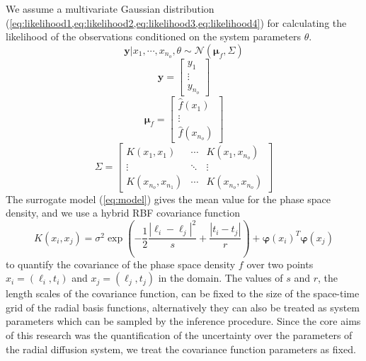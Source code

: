 We assume a multivariate Gaussian distribution 
(\cref{eq:likelihood1,eq:likelihood2,eq:likelihood3,eq:likelihood4}) for calculating the 
likelihood of the observations conditioned on the system parameters $\theta$.  
%
\begin{equation}\label{eq:likelihood1}
\mathbf{y} | x_1, \cdots, x_{n_o}, \theta \sim \mathcal{N} \left(\mathbf{\mu}_f, \Sigma \right )
\end{equation}
%
\begin{equation}\label{eq:likelihood2}
\mathbf{y} = \begin{bmatrix}
y_1\\ 
\vdots\\ 
y_{n_o}
\end{bmatrix}
\end{equation}
%
\begin{equation}\label{eq:likelihood3}
  \mathbf{\mu}_f = \begin{bmatrix}
\hat{f}(x_1)\\ 
\vdots\\ 
\hat{f}(x_{n_o})
\end{bmatrix}
\end{equation}
%
\begin{equation}\label{eq:likelihood4}
    \Sigma = \begin{bmatrix}
K(x_1, x_1) & \cdots  & K(x_1, x_{n_o})\\ 
\vdots & \ddots & \vdots\\ 
K(x_{n_o}, x_{n_{1}}) & \cdots  & K(x_{n_o}, x_{n_{o}})
\end{bmatrix}
\end{equation}
%
The surrogate model (\cref{eq:model}) gives the mean value for the phase space density, and we use 
a hybrid RBF covariance function 
\[
  K(x_{i}, x_{j}) = \sigma^2 \exp \left(
    -\frac{1}{2} \frac{|\ell_i - \ell_j|^2}{s} + \frac{|t_i - t_j|}{r}
  \right)  + \mathbf{\varphi}(x_i)^{T}\mathbf{\varphi}(x_j)
\] 
to quantify the covariance of the phase space density $f$ over two points $x_i = (\ell_i, t_i)$ and 
$x_j = (\ell_j, t_j)$ in the domain. The values of $s$ and $r$, the length scales of the covariance 
function, can be fixed to the size of the space-time grid of the radial basis functions, 
alternatively they can also be treated as system parameters which can be sampled by the inference 
procedure. Since the core aims of this research was the quantification of the uncertainty over the 
parameters of the radial diffusion system, we treat the covariance function parameters as fixed.

